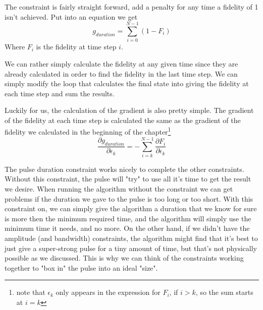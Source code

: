 
The constraint is fairly straight forward, add a penalty for any time a fidelity of 1 isn't achieved. Put into an equation we get
\[
    g_{duration} = \sum_{i = 0}^{N-1} (1 - F_i)
\]
Where $F_i$ is the fidelity at time step $i$.

We can rather simply calculate the fidelity at any given time since they are already calculated in order to find the fidelity in the last time step. We can simply modify the loop that calculates the final state into giving the fidelity at each time step and sum the results. 

Luckily for us, the calculation of the gradient is also pretty simple. The gradient of the fidelity at each time step is calculated the same as the gradient of the fidelity we calculated in the beginning of the chapter\footnote{note that $\epsilon_k$ only appears in the expression for $F_i$, if $i > k$, so the sum starts at $i = k$}
\[
    \frac{\partial g_{duration}}{\partial \epsilon_k} = -\sum_{i = k}^{N-1}\frac{\partial F_i}{\partial \epsilon_k}
\]

The pulse duration constraint works nicely to complete the other constraints. Without this constraint, the pulse will "try" to use all it's time to get the result we desire. When running the algorithm without the constraint we can get problems if the duration we gave to the pulse is too long or too short. With this constraint on, we can simply give the algorithm a duration that we know for sure is more then the minimum required time, and the algorithm will simply use the minimum time it needs, and no more. On the other hand, if we didn't have the amplitude (and bandwidth) constraints, the algorithm might find that it's best to just give a super-strong pulse for a tiny amount of time, but that's not physically possible as we discussed. This is why we can think of the constraints working together to "box in" the pulse into an ideal "size".

